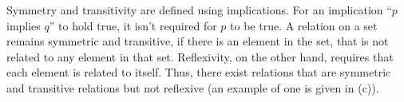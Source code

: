 \exercise
Symmetry and transitivity are defined using implications.
For an implication ``$p$ implies $q$'' to hold true, it isn’t required for $p$ to be true.
A relation on a set remains symmetric and transitive, if there is an element in the set, that is not related to any element in that set.
Reflexivity, on the other hand, requires that each element is related to itself.
Thus, there exist relations that are symmetric and transitive relations but not reflexive (an example of one is given in (c)).
